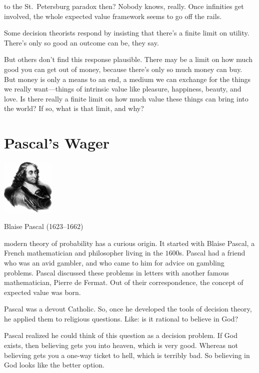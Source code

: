 \documentclass[justified]{tufte-book}
\theoremstyle{definition}
\theoremstyle{definition}
\theoremstyle{definition}
\theoremstyle{remark}
\begin{document}
 to the St.~Petersburg paradox then? Nobody knows, really. Once infinities get involved, the whole expected value framework seems to go off the rails.

Some decision theorists respond by insisting that there's a finite limit on utility. There's only so good an outcome can be, they say.

But others don't find this response plausible. There may be a limit on how much good you can get out of money, because there's only so much money can buy. But money is only a means to an end, a medium we can exchange for the things we really want---things of intrinsic value like pleasure, happiness, beauty, and love. Is there really a finite limit on how much value these things can bring into the world? If so, what is that limit, and why?

\hypertarget{pascals-wager}{%
\section{Pascal's Wager}\label{pascals-wager}}

\begin{marginfigure}
\includegraphics[width=1in]{img/pascal} \caption[Blaise Pascal (1623--1662)]{Blaise Pascal (1623--1662)}\label{fig:unnamed-chunk-122}
\end{marginfigure}

 modern theory of probability has a curious origin. It started with Blaise Pascal, a French mathematician and philosopher living in the \(1600\)s. Pascal had a friend who was an avid gambler, and who came to him for advice on gambling problems. Pascal discussed these problems in letters with another famous mathematician, Pierre de Fermat. Out of their correspondence, the concept of expected value was born.

Pascal was a devout Catholic. So, once he developed the tools of decision theory, he applied them to religious questions. Like: is it rational to believe in God?

Pascal realized he could think of this question as a decision problem. If God exists, then believing gets you into heaven, which is very good. Whereas not believing gets you a one-way ticket to hell, which is terribly bad. So believing in God looks like the better option.
\end{document}

